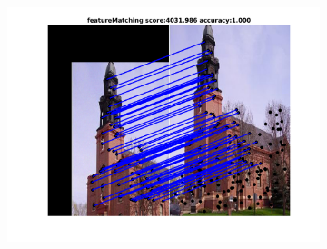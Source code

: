 \documentclass[
	fontsize=12pt,
	paper=a4,
	twoside=false,
	numbers=noenddot,
	plainheadsepline,
	toc=listof,
	toc=bibliography
]{scrartcl}
\begin{document}
\begin{figure}[h]
\begin{subfigure}[b]{0.33\textwidth}
		\includegraphics[scale=0.25]{"fig_ver2608/RealImages/ImgTrafo/anchor_descr/using_cpd_afftrafo/fi_4_featureMatching"} 
	\end{subfigure} 	
	

\end{figure}
\end{document}
